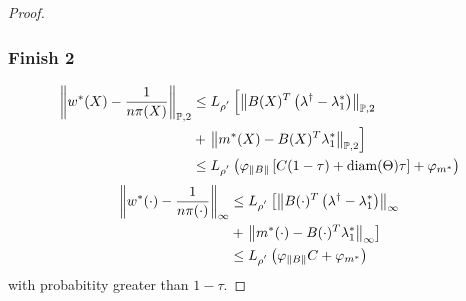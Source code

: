 \begin{proof}
\subsubsection*{Finish 2}
\begin{align}
  \left\lVert
    w^*(X)
    -
    \frac{1}{n \pi(X)}
  \right\rVert_{\mathbb{P}, 2}
  &\le
  L_{\rho^{'}}
  \left[ 
    \left\lVert
      B(X)^T 
      \left(
        \lambda^\dagger
        -
        \lambda^*_1
      \right)
    \right\rVert_{\mathbb{P},2}
    \right.
    \\
    &+
    \left. 
    \left\lVert
      m^*(X)
      -
      B(X)^T 
      \lambda^*_1
    \right\rVert_{\mathbb{P},2}
  \right]
  \\
  &\le
  L_{\rho^{'}}
  \left(
    \varphi_{\left\lVert B\right\rVert}
    \left[
    C(1 - \tau)
    +
    \text{diam}(\Theta)
    \tau
    \right]
    +
    \varphi_{m^*}
  \right)
\end{align}
\begin{align}
  \left\lVert
    w^*(\cdot)
    -
    \frac{1}{n \pi(\cdot)}
  \right\rVert_{\infty}
  &\le
  L_{\rho^{'}}
  \left[ 
    \left\lVert
      B(\cdot)^T 
      \left(
        \lambda^\dagger
        -
        \lambda^*_1
      \right)
    \right\rVert_{\infty}
    \right.
    \\
    &+
    \left. 
    \left\lVert
      m^*(\cdot)
      -
      B(\cdot)^T 
      \lambda^*_1
    \right\rVert_{\infty}
  \right]
  \\
  &\le
  L_{\rho^{'}}
  \left(
    \varphi_{\left\lVert B\right\rVert}
    C
    +
    \varphi_{m^*}
  \right)
\end{align}
with probabitity greater than 
$1 - \tau$.
\end{proof}
